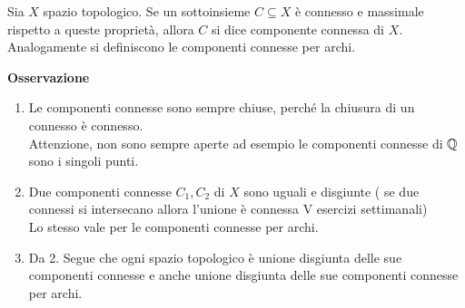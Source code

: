 \documentclass[12px]{article}
\begin{document}
 \begin{defi}
 	Sia $X$ spazio topologico. Se un sottoinsieme  $C\subseteq X$ è connesso e massimale rispetto a queste proprietà, allora $C$ si dice componente connessa di $X$. Analogamente si definiscono le componenti connesse per archi.
 \end{defi}
 \textbf{Osservazione}
 \begin{enumerate}
	 \item Le componenti connesse sono sempre chiuse, perché la chiusura di un connesso è connesso.\\
		 Attenzione, non sono sempre aperte ad esempio le componenti connesse di $\mathbb{Q}$ sono i singoli punti.
	 \item Due componenti connesse  $C_1, C_2$ di $X$ sono uguali e disgiunte ( se due connessi si intersecano allora l'unione è connessa V esercizi settimanali)\\
		 Lo stesso vale per le componenti connesse per archi.
	 \item Da 2. Segue che ogni spazio topologico è unione disgiunta delle sue componenti connesse e anche unione disgiunta delle sue componenti connesse per archi.
 \end{enumerate}
\end{document}

